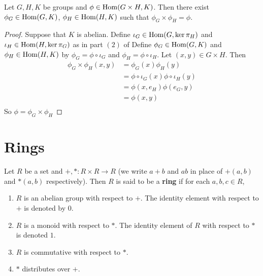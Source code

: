 \documentclass{book}
\begin{document}
	\begin{ex}
	 Let $G,H, K$ be groups and $\phi \in \operatorname{Hom}(G \times H, K)$. Then there exist $\phi_G \in \operatorname{Hom}(G,K)$, $\phi_H \in \operatorname{Hom}(H, K)$ such that $\phi_G \times \phi_H = \phi$.
	\end{ex}
	
	\begin{proof}
	Suppose that $K$ is abelian. Define $\iota_G \in \operatorname{Hom}(G, \ker \pi_H)$ and $\iota_H \in \operatorname{Hom}(H, \ker \pi_G)$ as in part $(2)$ of  Define $\phi_G \in \operatorname{Hom}(G, K)$ and $\phi_H \in \operatorname{Hom}(H,K)$ by  $\phi_G = \phi \circ \iota_G$ and $\phi_H = \phi \circ \iota_H $. Let $(x,y) \in G \times H$. Then 
	\begin{align*}
	\phi_G \times \phi_H(x,y) 
	&= \phi_G(x) \phi_H(y) \\
	&= \phi \circ \iota_G(x) \phi \circ \iota_H(y) \\
	&= \phi(x, e_H)\phi(e_G, y) \\
	&= \phi(x,y) \\
	\end{align*}
	So $\phi = \phi_G \times \phi_H$
	\end{proof}
	
	
	
	
	
	
	
	
	
	
	
	
	
	
	
	
	\newpage
	\section{Rings}
	
	\begin{defn}
	Let $R$ be a set and $+, *: R \times R 				
	\rightarrow R$ (we write $a+b$ and 
	$ab$ in place of $+(a,b)$ and $*(a,b)$ respectively).
	Then $R$ is said to be a \textbf{ring} if for each 
	$a,b,c \in R$,
	\begin{enumerate}
	\item $R$ is an abelian group with respect to $+$.
	 The identity element with respect to $+$ is denoted
	 by $0$.
	\item $R$ is a monoid with respect to $*$. The  
	identity element of $R$ with respect to $*$ is denoted $1$. 
	\item $R$ is commutative with respect to $*$.
	\item $*$ distributes over $+$.
	\end{enumerate}
	\end{defn}
	
\end{document}
